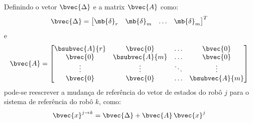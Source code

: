 Definindo o vetor $\bvec{\Delta}$ e a matrix $\bvec{A}$ como:
\begin{equation}
  \bvec{\Delta} = \begin{bmatrix}
    \mb{\delta}_r & \mb{\delta}_m & \hdots & \mb{\delta}_m
  \end{bmatrix}^T
\end{equation}
e
\begin{equation}
  \bvec{A} = \begin{bmatrix}
    \bsubvec{A}{r} & \bvec{0} & \hdots & \bvec{0} \\
    \bvec{0} & \bsubvec{A}{m} & \hdots & \bvec{0}\\
    \vdots & \vdots & \ddots & \vdots\\
    \bvec{0} & \bvec{0} & \hdots & \bsubvec{A}{m}
  \end{bmatrix}
\end{equation}
pode-se reescrever a mudança de referência do vetor de estados do robô 
$j$ para o sistema de referência do robô $k$, como:
\begin{equation}
  \bvec{x}^{j\to k} = \bvec{\Delta} + \bvec{A} \, \bvec{x}^j
  \label{eq:state-vector-change-reference-frame}
\end{equation}

